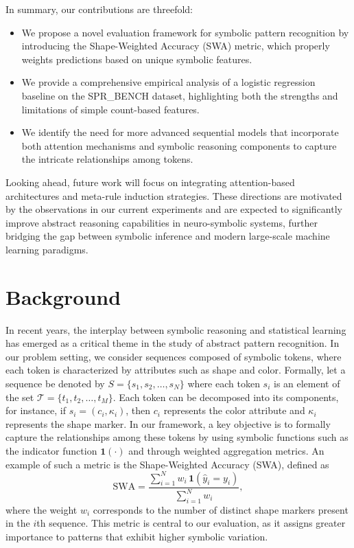 \documentclass{article}
\begin{document}
In summary, our contributions are threefold:
\begin{itemize}
    \item We propose a novel evaluation framework for symbolic pattern recognition by introducing the Shape-Weighted Accuracy (SWA) metric, which properly weights predictions based on unique symbolic features.
    \item We provide a comprehensive empirical analysis of a logistic regression baseline on the SPR\_BENCH dataset, highlighting both the strengths and limitations of simple count-based features.
    \item We identify the need for more advanced sequential models that incorporate both attention mechanisms and symbolic reasoning components to capture the intricate relationships among tokens.
\end{itemize}
Looking ahead, future work will focus on integrating attention-based architectures and meta-rule induction strategies. These directions are motivated by the observations in our current experiments and are expected to significantly improve abstract reasoning capabilities in neuro-symbolic systems, further bridging the gap between symbolic inference and modern large-scale machine learning paradigms.

\section{Background}
In recent years, the interplay between symbolic reasoning and statistical learning has emerged as a critical theme in the study of abstract pattern recognition. In our problem setting, we consider sequences composed of symbolic tokens, where each token is characterized by attributes such as shape and color. Formally, let a sequence be denoted by \( S = \{s_1, s_2, \ldots, s_N\} \) where each token \( s_i \) is an element of the set \(\mathcal{T} = \{t_1, t_2, \ldots, t_M\}\). Each token can be decomposed into its components, for instance, if \( s_i = (c_i, \kappa_i) \), then \( c_i \) represents the color attribute and \(\kappa_i\) represents the shape marker. In our framework, a key objective is to formally capture the relationships among these tokens by using symbolic functions such as the indicator function \(\mathbf{1}(\cdot)\) and through weighted aggregation metrics. An example of such a metric is the Shape-Weighted Accuracy (SWA), defined as 
\[
\mathrm{SWA} = \frac{\sum_{i=1}^{N} w_i \, \mathbf{1}(\hat{y}_i = y_i)}{\sum_{i=1}^{N} w_i},
\]
where the weight \(w_i\) corresponds to the number of distinct shape markers present in the \(i\)th sequence. This metric is central to our evaluation, as it assigns greater importance to patterns that exhibit higher symbolic variation.
\end{document}
